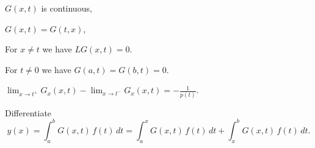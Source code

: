 \documentclass{homework}
\begin{document}
\vfill

\begin{problem}
  $G(x,t)$ is continuous,
\end{problem}

\vfill

\begin{problem}
  $G(x,t) = G(t,x)$,
\end{problem}

\vfill

\begin{problem}
For $x \neq t$ we have $LG(x,t) = 0$.
\end{problem}

\vfill

  \begin{problem}
For $t \neq 0$ we have $G(a,t) = G(b,t) = 0$.
  \end{problem}

  \vfill
  
    \begin{problem}
 $\lim_{x \to t^{+}} G_x(x,t) - \lim_{x \to t^{-}} G_x(x,t) = -\frac{1}{p(t)}$.
\end{problem}

\vfill

\begin{problem}
  Differentiate
  \[
    y(x) = \int_a^b G(x,t) \, f(t)  \, dt = \int_a^x G(x,t) \, f(t) \, dt + \int_x^b G(x,t) \, f(t) \, dt.
  \]
\end{problem}
\end{document}
